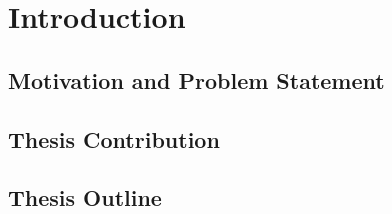 %
%
% 
% 
% 

\newenvironment{mykeithtabbing}[1]{%
\begin{tabular}{lp{0.9\hsize}}
}{%
\end{tabular}
}

\newcommand{\mybadgood}[2]{%
\begin{mykeithtabbing}
{}\emph{Bad:}  & \sout{#1}  \\
\emph{Good:}   & #2  \\
\end{mykeithtabbing}

}

\chapter{Introduction}
\label{chap:Style}
\section{Motivation and Problem Statement}
\section{Thesis Contribution}
\section{Thesis Outline}


